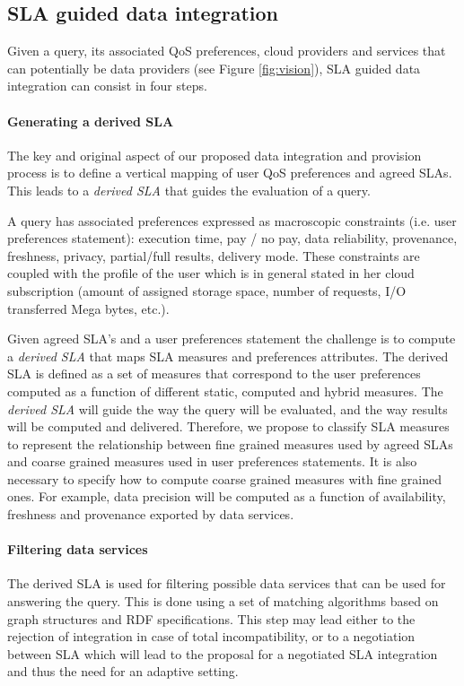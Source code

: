 \subsection{SLA guided data integration}
Given a query, its associated QoS preferences, cloud providers  and  services that can potentially be data providers (see Figure \ref{fig:vision}),  SLA guided data  integration can consist in four steps.  
\paragraph{Generating a derived SLA}  
The key and original aspect of   our proposed data integration and provision process is  to define  a vertical mapping of user QoS preferences and agreed SLAs. This  leads to a {\em derived SLA} that guides the evaluation of a query. 

A query has associated preferences  expressed as macroscopic constraints (i.e. user preferences statement): execution time, pay / no pay, data reliability, provenance, freshness, privacy, partial/full results, delivery mode. These constraints are coupled with the profile of the user which is in general stated in her cloud subscription (amount of assigned storage space, number of requests, I/O transferred Mega bytes, etc.). 

Given agreed SLA's and a user preferences statement the challenge is to compute a  {\em derived SLA} that  maps SLA measures and preferences attributes.  The derived SLA is defined as a set of measures that correspond to the user preferences computed as a function of different static, computed and hybrid measures. The {\em derived SLA}  will guide the way the query will be evaluated, and the way results will be computed and delivered.
Therefore, we propose to classify SLA measures to represent the relationship between fine grained measures used by agreed SLAs and coarse grained measures used in user preferences statements. It is also necessary to specify how to compute coarse grained measures with fine grained ones. For example, data precision will be computed as a function of availability, freshness and provenance exported by data services. 

  
\paragraph{Filtering data services} 
The derived SLA  is used for filtering possible data services that can be used for answering the query. This is done using a set of matching algorithms based on  graph structures and RDF specifications. This step may lead either to the rejection of integration in case of total incompatibility, or to a negotiation between SLA which will lead  to the proposal for a negotiated SLA integration and thus the need for an adaptive setting.


